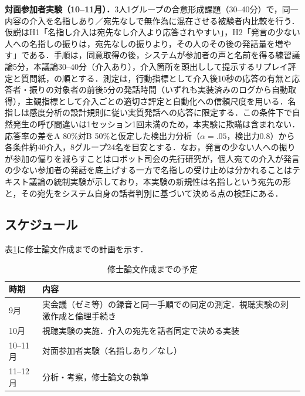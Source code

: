 \documentclass[a4paper]{ltjsarticle}
\begin{document}
\textbf{対面参加者実験（10--11月）．}3人1グループの合意形成課題（30--40分）で，同一内容の介入を名指しあり／宛先なしで無作為に混在させる被験者内比較を行う．仮説はH1「名指し介入は宛先なし介入より応答されやすい」，H2「発言の少ない人への名指しの振りは，宛先なしの振りより，その人のその後の発話量を増やす」である．手順は，同意取得の後，システムが参加者の声と名前を得る練習議論5分，本議論30--40分（介入あり），介入箇所を頭出しして提示するリプレイ評定と質問紙，の順とする．測定は，行動指標として介入後10秒の応答の有無と応答者・振りの対象者の前後5分の発話時間（いずれも実装済みのログから自動取得），主観指標として介入ごとの適切さ評定と自動化への信頼尺度を用いる．名指しは感度分析の設計規則に従い実質発話への応答に限定する．この条件下で自然発生の呼び間違いは1セッション1回未満のため，本実験に欺瞞は含まれない．応答率の差をA 80\%対B 50\%と仮定した検出力分析（$\alpha=.05$，検出力0.8）から各条件約40介入，8グループ24名を目安とする．なお，発言の少ない人への振りが参加の偏りを減らすことはロボット司会の先行研究\cite{asadi}が，個人宛ての介入が発言の少ない参加者の発話を底上げする一方で名指しの受け止めは分かれることはテキスト議論の統制実験\cite{alsobay}が示しており，本実験の新規性は名指しという宛先の形と，その宛先をシステム自身の話者判別に基づいて決める点の検証にある．

\subsection{スケジュール}
表\ref{tab:sched}に修士論文作成までの計画を示す．

\begin{table}[tb]
\centering
\caption{修士論文作成までの予定}
\label{tab:sched}
\small
\begin{tabular}{lp{52mm}}
\toprule
時期 & 内容 \\
\midrule
9月 & 実会議（ゼミ等）の録音と同一手順での同定の測定．視聴実験の刺激作成と倫理手続き \\
10月 & 視聴実験の実施．介入の宛先を話者同定で決める実装 \\
10--11月 & 対面参加者実験（名指しあり／なし） \\
11--12月 & 分析・考察，修士論文の執筆 \\
\bottomrule
\end{tabular}
\end{table}
\end{document}
